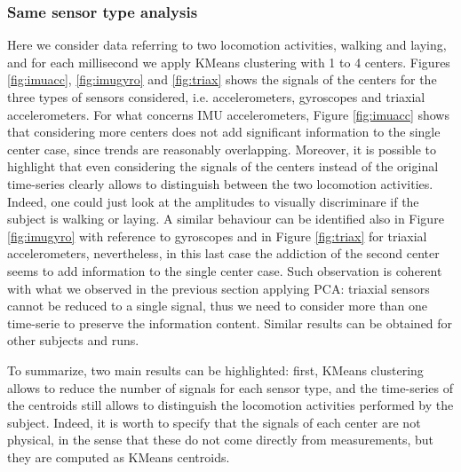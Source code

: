 \documentclass[10pt, a4paper, twocolumn]{article}
\theoremstyle{definition}
\begin{document}
\subsubsection{Same sensor type analysis}
Here we consider data referring to two locomotion activities, walking and laying, and for each millisecond we apply KMeans clustering with 1 to 4 centers. Figures \ref{fig:imuacc}, \ref{fig:imugyro} and \ref{fig:triax} shows the signals of the centers for the three types of sensors considered, i.e. accelerometers, gyroscopes and triaxial accelerometers. For what concerns IMU accelerometers, Figure \ref{fig:imuacc} shows that considering more centers does not add significant information to the single center case, since trends are reasonably overlapping. Moreover, it is possible to highlight that even considering the signals of the centers instead of the original time-series clearly allows to distinguish between the two locomotion activities. Indeed, one could just look at the amplitudes to visually discriminare if the subject is walking or laying. A similar behaviour can be identified also in Figure \ref{fig:imugyro} with reference to gyroscopes and in Figure \ref{fig:triax}
for triaxial accelerometers, nevertheless, in this last case the addiction of the second center seems to add information to the single center case. Such observation is coherent with what we observed in the previous section applying PCA: triaxial sensors cannot be reduced to a single signal, thus we need to consider more than one time-serie to preserve the information content. Similar results can be obtained for other subjects and runs.
\par
To summarize, two main results can be highlighted: first, KMeans clustering allows to reduce the number of signals for each sensor type, and the time-series of the centroids still allows to distinguish the locomotion activities performed by the subject. Indeed, it is worth to specify that the signals of each center are not physical, in the sense that these do not come directly from measurements, but they are computed as KMeans centroids.
\end{document}
